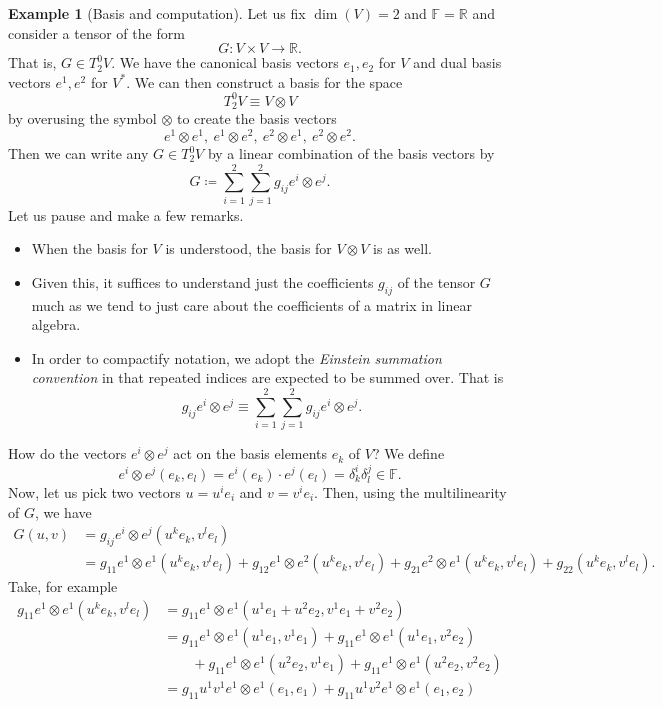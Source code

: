 \documentclass[12pt]{article}
\newcommand{\R}{\mathbb{R}}
\newcommand{\field}{\mathbb{F}}
\theoremstyle{definition}
\newtheorem{example}{Example}[section]
\begin{document}
\begin{example}[Basis and computation]
Let us fix $\dim(V)=2$ and $\field = \R$ and consider a tensor of the form
\[
G\colon V\times V \to \R.
\]
That is, $G\in T_2^0V$.  We have the canonical basis vectors $e_1,e_2$ for $V$ and dual basis vectors $e^1, e^2$ for $V^*$.  We can then construct a basis for the space
\[
T_2^0V \equiv V\otimes V
\]
by overusing the symbol $\otimes$ to create the basis vectors
\[
e^1\otimes e^1, ~e^1\otimes e^2,~ e^2\otimes e^1,~ e^2\otimes e^2.
\]
Then we can write any $G\in T_2^0V$ by a linear combination of the basis vectors by
\[
G\coloneqq \sum_{i=1}^2\sum_{j=1}^2 g_{ij}e^i\otimes e^j.
\]
Let us pause and make a few remarks.
\begin{itemize}
    \item When the basis for $V$ is understood, the basis for $V\otimes V$ is as well.  
    \item Given this, it suffices to understand just the coefficients $g_{ij}$ of the tensor $G$ much as we tend to just care about the coefficients of a matrix in linear algebra.
    \item In order to compactify notation, we adopt the \emph{Einstein summation convention} in that repeated indices are expected to be summed over. That is
    \[
    g_{ij}e^i\otimes e^j \equiv \sum_{i=1}^2 \sum_{j=1}^2 g_{ij}e^i \otimes e^j.
    \]
\end{itemize}
How do the vectors $e^i\otimes e^j$ act on the basis elements $e_k$ of $V$? We define
\[
e^i\otimes e^j (e_k,e_l)=e^i(e_k)\cdot e^j(e_l)=\delta^i_k\delta^j_l \in \field.
\]
Now, let us pick two vectors $u=u^ie_i$ and $v=v^ie_i$. Then, using the multilinearity of $G$, we have
\begin{align*}
G(u,v)&=g_{ij}e^i\otimes e^j(u^ke_k,v^le_l)\\
&= g_{11}e^1\otimes e^1(u^k e_k,v^l e_l)+g_{12}e^1\otimes e^2(u^k e_k,v^l e_l)+g_{21}e^2\otimes e^1(u^k e_k,v^l e_l) + g_22(u^k e_k,v^l e_l).
\end{align*}
Take, for example
\begin{align*}
    g_{11}e^1\otimes e^1 (u^k e_k,v^l e_l)&= g_{11}e^1\otimes e^1 ( u^1e_1 + u^2 e_2, v^1 e_1 + v^2 e_2)\\
    &=g_{11}e^1\otimes e^1(u^1 e_1, v^1 e_1) + g_{11}e^1\otimes e^1(u^1 e_1, v^2 e_2) \\
    &\qquad +g_{11}e^1\otimes e^1(u^2 e_2, v^1 e_1)+g_{11}e^1\otimes e^1(u^2 e_2, v^2 e_2)\\[5pt]
    &=g_{11}u^1v^1e^1\otimes e^1(e_1, e_1) + g_{11}u^1v^2e^1\otimes e^1(e_1,e_2) \\

\end{align*}
\end{example}
\end{document}
